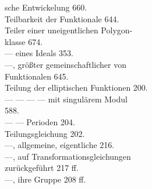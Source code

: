 \begin{minipage}[t]{0.48\textwidth}
\noindent {}sche Entwickelung 660.\\
Teilbarkeit der Funktionale 644.\\
Teiler einer uneigentlichen Polygon-\\
klasse 674.\\
--- eines Ideals 353.\\
---, größter gemeinschaftlicher von\\
Funktionalen 645.\\
Teilung der elliptischen Funktionen 200.\\
--- --- --- --- mit singulärem Modul\\
588.\\
--- --- Perioden 204.\\
Teilungsgleichung 202.\\
---, allgemeine, eigentliche 216.\\
---, auf Transformationsgleichungen\\
zurückgeführt 217 ff.\\
---, ihre Gruppe 208 ff.
\end{minipage}
